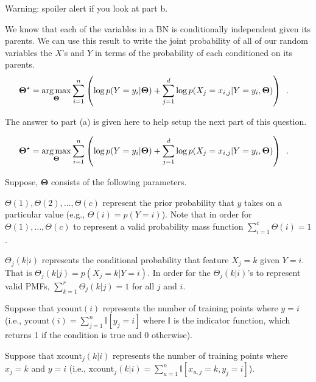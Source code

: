 \documentclass[assignment04_Solutions]{subfiles}
\begin{document}
\begin{exercise}[(60 minutes)]
Warning: spoiler alert if you look at part b.
\begin{boxedsolution}
We know that each of the variables in a BN is conditionally independent given its parents.  We can use this result to write the joint probability of all of our random variables the $X$'s and $Y$ in terms of the probability of each conditioned on its parents.
\begin{align}
\mathbf{\Theta^\star} &= \operatorname*{arg\,max}_{\mathbf{\Theta}} \sum_{i=1}^n  \left ( \log p(Y = y_i | \mathbf{\Theta})  + \sum_{j=1}^d \log p(X_j = x_{i,j} | Y = y_i,  \mathbf{\Theta}) \right ) \enspace . 
\end{align}
\end{boxedsolution}

\item The answer to part (a) is given here to help setup the next part of this question.

\begin{align}
\mathbf{\Theta^\star} &= \operatorname*{arg\,max}_{\mathbf{\Theta}} \sum_{i=1}^n  \left ( \log p(Y = y_i  | \mathbf{\Theta})  + \sum_{j=1}^d \log p(X_j = x_{i,j} | Y = y_i,  \mathbf{\Theta}) \right ) \enspace . \label{eq:nbmlesolved}
\end{align}

Suppose, $\mathbf{\Theta}$ consists of the following parameters.
\bi
\item $\Theta(1), \Theta(2), \ldots, \Theta(c)$ represent the prior probability that $y$ takes on a particular value (e.g., $\Theta(i) = p(Y = i)$).  Note that in order for $\Theta(1), \ldots, \Theta(c)$ to represent a valid probability mass function $\sum_{i=1}^c \Theta(i) = 1$.
\item $\Theta_{j}(k | i)$ represents the conditional probability that feature $X_j = k$ given $Y = i$.  That is $\Theta_{j}(k | j) = p(X_j = k | Y = i)$.  In order for the $\Theta_j(k|i)$'s to represent valid PMFs, $\sum_{k=1}^{r} \Theta_{j}(k | j) = 1$ for all $j$ and $i$.
\ei

Suppose that $\mbox{ycount}(i)$ represents the number of training points where $y = i$ (i.e., $\mbox{ycount}(i) = \sum_{j=1}^n \mathbb{I} \left [y_j = i \right]$ where $\mathbb{I}$ is the indicator function, which returns 1 if the condition is true and 0 otherwise).

Suppose that $\mbox{xcount}_j(k|i)$ represents the number of training points where $x_j = k$ and $y = i$ (i.e., $\mbox{xcount}_j (k|i) = \sum_{u=1}^n \mathbb{I} \left [ x_{u, j} = k, y_j = i \right ]$).


\end{exercise}
\end{document}
